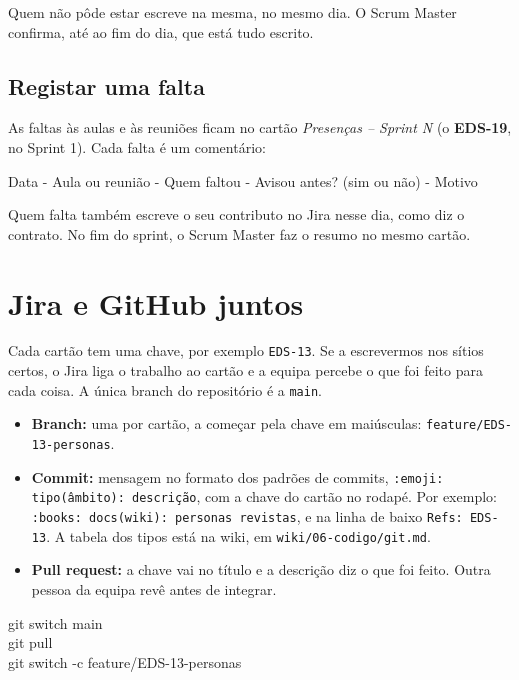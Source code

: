 \documentclass[11pt,a4paper]{article}
\begin{document}
Quem não pôde estar escreve na mesma, no mesmo dia. O Scrum Master confirma, até ao fim do dia, que está tudo escrito.

\subsection{Registar uma falta}

As faltas às aulas e às reuniões ficam no cartão \textit{Presenças – Sprint N} (o \textbf{EDS-19}, no Sprint 1). Cada falta é um comentário:

\begin{codigo}
Data - Aula ou reunião - Quem faltou - Avisou antes? (sim ou não) - Motivo
\end{codigo}

Quem falta também escreve o seu contributo no Jira nesse dia, como diz o contrato. No fim do sprint, o Scrum Master faz o resumo no mesmo cartão.

\section{Jira e GitHub juntos}

Cada cartão tem uma chave, por exemplo \texttt{EDS-13}. Se a escrevermos nos sítios certos, o Jira liga o trabalho ao cartão e a equipa percebe o que foi feito para cada coisa. A única branch do repositório é a \texttt{main}.

\begin{itemize}
  \item \textbf{Branch:} uma por cartão, a começar pela chave em maiúsculas: \texttt{feature/EDS-13-personas}.
  \item \textbf{Commit:} mensagem no formato dos padrões de commits, \texttt{:emoji: tipo(âmbito): descrição}, com a chave do cartão no rodapé. Por exemplo: \texttt{:books: docs(wiki): personas revistas}, e na linha de baixo \texttt{Refs: EDS-13}. A tabela dos tipos está na wiki, em \texttt{wiki/06-codigo/git.md}.
  \item \textbf{Pull request:} a chave vai no título e a descrição diz o que foi feito. Outra pessoa da equipa revê antes de integrar.
\end{itemize}

\begin{codigo}
git switch main\\
git pull\\
git switch -c feature/EDS-13-personas
\end{codigo}
\end{document}
